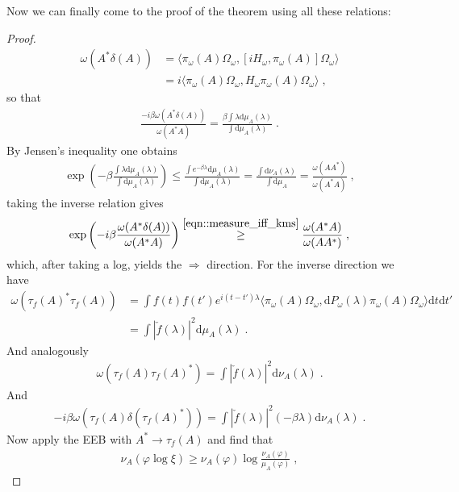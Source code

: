 \documentclass[
a4paper, %
11pt, %
onecolumn, %
openany, %
]{memoir}
\theoremstyle{definition}
\theoremstyle{remark}
\theoremstyle{plain}
\begin{document}
Now we can finally come to the proof of the theorem using all these relations: \begin{proof}
\begin{align}
\omega(A^*\delta(A))&=\langle\pi_{\omega}(A)\Omega_{\omega},\left[iH_{\omega},\pi_{\omega}(A)\right]\Omega_{\omega}\rangle\\
&=i\langle \pi_{\omega}(A)\Omega_{\omega},H_{\omega}\pi_{\omega}(A)\Omega_{\omega}\rangle\; ,
\end{align}
so that \begin{align}
\frac{-i\beta\omega(A^*\delta(A))}{\omega(A^*A)}=\frac{\beta \int \lambda \mathrm{d}\mu_A(\lambda)}{\int\mathrm{d}\mu_A(\lambda)}\; .
\end{align}
By Jensen's inequality one obtains \begin{align}
\exp\left(-\beta \frac{\int\lambda\mathrm{d}\mu_A(\lambda)}{\int\mathrm{d}\mu_A(\lambda)}\right)\leq \frac{\int e^{-\beta\lambda}\mathrm{d}\mu_A(\lambda)}{\int\mathrm{d}\mu_{A}(\lambda)}=\frac{\int\mathrm{d}\nu_A(\lambda)}{\int\mathrm{d}\mu_A}=\frac{\omega(AA^*)}{\omega(A^*A)}\; ,
\end{align}
taking the inverse relation gives \begin{align}
\exp\left(-i\beta\frac{\omega(A^*\delta(A))}{\omega(A^*A)}\right)\overset{\eqref{eqn::measure_iff_kms}}{\geq} \frac{\omega(A^*A)}{\omega(AA^*)}\; ,
\end{align}
which, after taking a log, yields the $\Rightarrow$ direction. For the inverse direction we have \begin{align}
\omega(\tau_f(A)^*\tau_f(A))&=\int f(t)f(t')e^{i(t-t')\lambda}\langle \pi_{\omega}(A)\Omega_{\omega},\mathrm{d}P_{\omega}(\lambda)\pi_{\omega}(A)\Omega_{\omega}\rangle\mathrm{d}t\mathrm{d}t'\\
&=\int |\check{f}(\lambda)|^2\mathrm{d}\mu_A(\lambda)\; .
\end{align}
And analogously \begin{align}
\omega(\tau_f(A)\tau_f(A)^*)=\int|\check{f}(\lambda)|^2\mathrm{d}\nu_A(\lambda)\; .
\end{align}
And \begin{align}
-i\beta\omega(\tau_f(A)\delta(\tau_f(A)^*))=\int|\check{f}(\lambda)|^2(-\beta\lambda)\mathrm{d}\nu_A(\lambda)\; .
\end{align}
Now apply the EEB with $A^*\rightarrow \tau_f(A)$ and find that \begin{align}
\nu_A(\varphi\log\xi)\geq \nu_A(\varphi)\log \frac{\nu_A(\varphi)}{\mu_A(\varphi)}\; ,
\end{align}

\end{proof}
\end{document}

